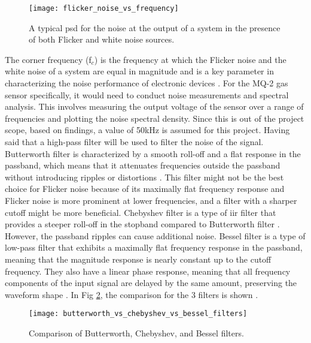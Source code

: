 \begin{figure}[ht]
    \centering\texttt{[image: flicker\_noise\_vs\_frequency]}
    \caption{A typical \acrshort{psd} for the noise at the output of a system in the presence of both Flicker and white noise sources.}
    \label{fig:flicker_noise_vs_frequency}
\end{figure}

The corner frequency (f$_{c}$) is the frequency at which the Flicker noise and the white noise of a system are equal in magnitude and is a key parameter in characterizing the noise performance of electronic devices \cite{smulko_2024}. For the MQ-2 gas sensor specifically, it would need to conduct noise measurements and spectral analysis. This involves measuring the output voltage of the sensor over a range of frequencies and plotting the noise spectral density. Since this is out of the project scope, based on \cite{smulko_2024} findings, a value of 50kHz is assumed for this project. Having said that a high-pass filter will be used to filter the noise of the signal. \\

Butterworth filter is characterized by a smooth roll-off and a flat response in the passband, which means that it attenuates frequencies outside the passband without introducing ripples or distortions \cite{ruofei_2021}. This filter might not be the best choice for Flicker noise because of its maximally flat frequency response and Flicker noise is more prominent at lower frequencies, and a filter with a sharper cutoff might be more beneficial. Chebyshev filter is a type of \acrfull{iir} filter that provides a steeper roll-off in the stopband compared to Butterworth filter \cite{podder_2014}. However, the passband ripples can cause additional noise. Bessel filter is a type of low-pass filter that exhibits a maximally flat frequency response in the passband, meaning that the magnitude response is nearly constant up to the cutoff frequency. They also have a linear phase response, meaning that all frequency components of the input signal are delayed by the same amount, preserving the waveform shape \cite{ashu_2021}. In Fig \ref{fig:butterworth_vs_chebyshev_vs_bessel_filters}, the comparison for the 3 filters is shown \cite{kikkert_2008}. \\

\begin{figure}[ht]
    \centering\texttt{[image: butterworth\_vs\_chebyshev\_vs\_bessel\_filters]}
    \caption{Comparison of Butterworth, Chebyshev, and Bessel filters.}
    \label{fig:butterworth_vs_chebyshev_vs_bessel_filters}
\end{figure}

